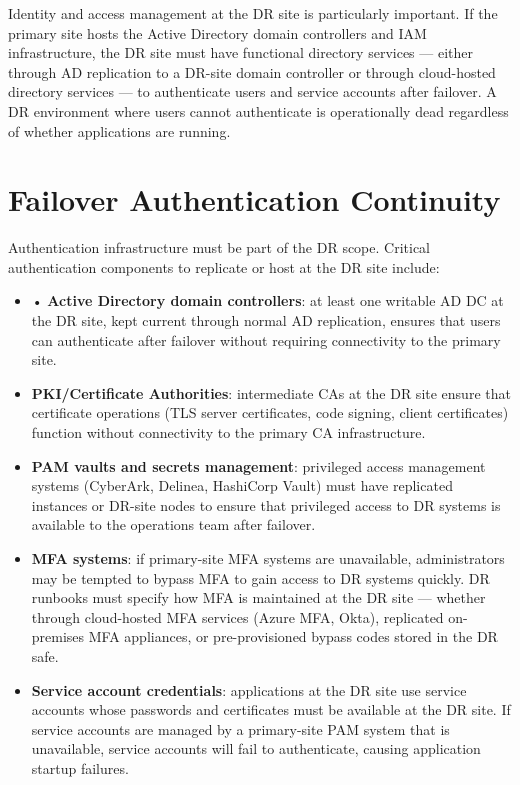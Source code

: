 Identity and access management at the DR site is particularly important. If the primary site hosts the Active Directory domain controllers and IAM infrastructure, the DR site must have functional directory services --- either through AD replication to a DR-site domain controller or through cloud-hosted directory services --- to authenticate users and service accounts after failover. A DR environment where users cannot authenticate is operationally dead regardless of whether applications are running.

\section{Failover Authentication Continuity}
Authentication infrastructure must be part of the DR scope. Critical authentication components to replicate or host at the DR site include:

\begin{itemize}
  \item • \textbf{Active Directory domain controllers}: at least one writable AD DC at the DR site, kept current through normal AD replication, ensures that users can authenticate after failover without requiring connectivity to the primary site.
  \item \textbf{PKI/Certificate Authorities}: intermediate CAs at the DR site ensure that certificate operations (TLS server certificates, code signing, client certificates) function without connectivity to the primary CA infrastructure.
  \item \textbf{PAM vaults and secrets management}: privileged access management systems (CyberArk, Delinea, HashiCorp Vault) must have replicated instances or DR-site nodes to ensure that privileged access to DR systems is available to the operations team after failover.
  \item \textbf{MFA systems}: if primary-site MFA systems are unavailable, administrators may be tempted to bypass MFA to gain access to DR systems quickly. DR runbooks must specify how MFA is maintained at the DR site --- whether through cloud-hosted MFA services (Azure MFA, Okta), replicated on-premises MFA appliances, or pre-provisioned bypass codes stored in the DR safe.
  \item \textbf{Service account credentials}: applications at the DR site use service accounts whose passwords and certificates must be available at the DR site. If service accounts are managed by a primary-site PAM system that is unavailable, service accounts will fail to authenticate, causing application startup failures.
\end{itemize}

